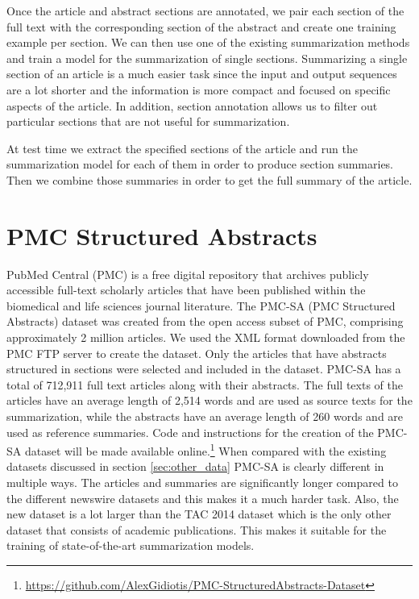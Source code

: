 \documentclass[runningheads]{llncs}
\begin{document}
Once the article and abstract sections are annotated, we pair each section of the full text with the corresponding section of the abstract and create one training example per section. We can then use one of the existing summarization methods and train a model for the summarization of single sections. Summarizing a single section of an article is a much easier task since the input and output sequences are a lot shorter and the information is more compact and focused on specific aspects of the article. In addition, section annotation allows us to filter out particular sections that are not useful for summarization.

At test time we extract the specified sections of the article and run the summarization model for each of them in order to produce section summaries. Then we combine those summaries in order to get the full summary of the article.


\section{PMC Structured Abstracts}

PubMed Central (PMC) is a free digital repository that archives publicly accessible full-text scholarly articles that have been published within the biomedical and life sciences journal literature. The PMC-SA (PMC Structured Abstracts) dataset was created from the open access subset of PMC, comprising approximately 2 million articles. We used the XML format downloaded from the PMC FTP server to create the dataset. Only the articles that have abstracts structured in sections were selected and included in the dataset. PMC-SA has a total of 712,911 full text articles along with their abstracts. The full texts of the articles have an average length of 2,514 words and are used as source texts for the summarization, while the abstracts have an average length of 260 words and are used as reference summaries. Code and instructions for the creation of the PMC-SA dataset will be made available online.\footnote{\url{https://github.com/AlexGidiotis/PMC-StructuredAbstracts-Dataset}} When compared with the existing datasets discussed in section \ref{sec:other_data} PMC-SA is clearly different in multiple ways. The articles and summaries are significantly longer compared to the different newswire datasets and this makes it a much harder task. Also, the new dataset is a lot larger than the TAC 2014 dataset which is the only other dataset that consists of academic publications. This makes it suitable for the training of state-of-the-art summarization models. 
\end{document}
